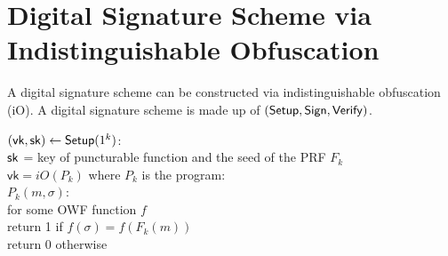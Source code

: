 
\newcommand{\extline}{$\scriptsize$-$\normalsize$\!}
\newcommand{\lextlineend}{$\scriptsize$\lhd\!$\normalsize$}
\newcommand{\rextlineend}{$\scriptsize\rule{.1ex}{0ex}$\rhd$\normalsize$}


\newcommand\extlines[1]{%
  \setcounter{index}{0}%
  \whiledo {\value{index}< #1}
  {\addtocounter{index}{1}\extline}
}

\newcommand\rextlinearrow[2]{$
  \setbox0\hbox{$\extlines{#2}\rextlineend$}%
  \tiny$%
  \!\!\!\!\begin{array}{c}%
  \mathrm{#1}\\%
  \usebox0%
  \end{array}%
  $\normalsize$\!\!%
}

\newcommand\lextlinearrow[2]{$
  \setbox0\hbox{$\lextlineend\extlines{#2}$}%
  \tiny%
  $%
  \!\!\!\!\begin{array}{c}%
  \mathrm{#1}\\%
  \usebox0%
  \end{array}%
  $\normalsize$\!\!%
}

\renewcommand\lextlinearrow[2]{%
}

\renewcommand\rextlinearrow[2]{%
}
\renewcommand\lextlinearrow[2]{%
   $\stackrel{\mathrm{#1}}{\leftarrow}$%
}

\renewcommand\rextlinearrow[2]{%
  $\stackrel{\mathrm{#1}}{\rightarrow}$%
}



\section{Digital Signature Scheme via Indistinguishable Obfuscation}
A digital signature scheme can be constructed via indistinguishable obfuscation (iO).  A digital signature scheme is made up of $(\mathsf{Setup}, \mathsf{Sign}, \mathsf{Verify})$.\\

\newcommand{\vk}{\mathsf{vk}}

\noindent $(\vk, \sk) \leftarrow \SETUP(1^k)$:\\
\indent $\mathsf{sk}$ = key of puncturable function and the seed of the PRF $F_k$\\
\indent $\vk = iO(P_k)$ where $P_k$ is the program:\\
\indent \indent $P_k(m, \sigma)$:\\
\indent \indent \indent for some OWF function $f$\\
\indent \indent \indent \indent return 1 if $f(\sigma) = f(F_k(m))$\\
\indent \indent \indent \indent return 0 otherwise\\


